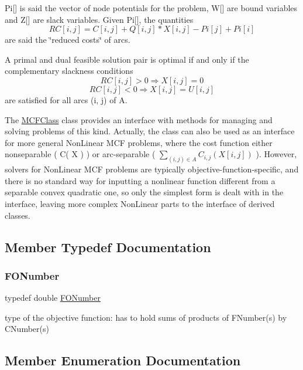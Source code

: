 Pi\mbox{[}\mbox{]} is said the vector of node potentials for the problem, W\mbox{[}\mbox{]} are bound variables and Z\mbox{[}\mbox{]} are slack variables. Given Pi\mbox{[}\mbox{]}, the quantities \[ RC[ i , j ] = C[ i , j ] + Q[ i , j ] * X[ i , j ] - Pi[ j ] + Pi[ i ] \] are said the \char`\"{}reduced costs\char`\"{} of arcs.

A primal and dual feasible solution pair is optimal if and only if the complementary slackness conditions \[ RC[ i , j ] > 0 \Rightarrow X[ i , j ] = 0 \] \[ RC[ i , j ] < 0 \Rightarrow X[ i , j ] = U[ i , j ] \] are satisfied for all arcs (i, j) of A.

The \mbox{\hyperlink{class_m_c_f_class}{M\+C\+F\+Class}} class provides an interface with methods for managing and solving problems of this kind. Actually, the class can also be used as an interface for more general Non\+Linear M\+CF problems, where the cost function either nonseparable ( C( X ) ) or arc-\/separable ( $\sum_{ (i, j) \in A } C_{i,j}( X[ i, j ] )$ ). However, solvers for Non\+Linear M\+CF problems are typically objective-\/function-\/specific, and there is no standard way for inputting a nonlinear function different from a separable convex quadratic one, so only the simplest form is dealt with in the interface, leaving more complex Non\+Linear parts to the interface of derived classes. 

\subsection{Member Typedef Documentation}
\mbox{\label{class_m_c_f_class_af5ee7b3099b0bc780a6a4b43629488fa}} 
\subsubsection{\texorpdfstring{F\+O\+Number}{FONumber}}
{\footnotesize\ttfamily typedef double \mbox{\hyperlink{class_m_c_f_class_af5ee7b3099b0bc780a6a4b43629488fa}{F\+O\+Number}}}

type of the objective function\+: has to hold sums of products of F\+Number(s) by C\+Number(s) 

\subsection{Member Enumeration Documentation}
\mbox{\label{class_m_c_f_class_ad7b7f4459be059eae1a7d83a8e190c28}} 
